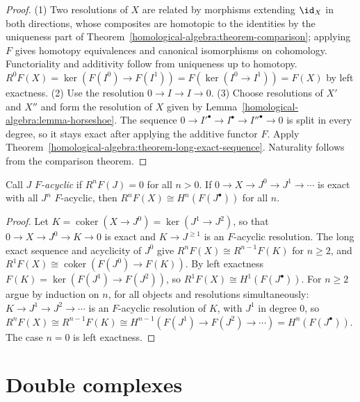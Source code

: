 \begin{proof}
(1) Two resolutions of $X$ are related by morphisms extending $\id_X$ in both directions, whose composites are homotopic
to the identities by the uniqueness part of Theorem~\ref{homological-algebra:theorem-comparison}; applying $F$ gives
homotopy equivalences and canonical isomorphisms on cohomology. Functoriality and additivity follow from uniqueness up
to homotopy. $R^0F(X) = \ker(F(I^0) \to F(I^1)) = F(\ker(I^0 \to I^1)) = F(X)$ by left exactness.
(2) Use the resolution $0 \to I \to I \to 0$.
(3) Choose resolutions of $X'$ and $X''$ and form the resolution of $X$ given by
Lemma~\ref{homological-algebra:lemma-horseshoe}. The sequence $0 \to I'^\bullet \to I^\bullet \to I''^\bullet \to 0$ is split in every
degree, so it stays exact after applying the additive functor $F$. Apply
Theorem~\ref{homological-algebra:theorem-long-exact-sequence}. Naturality follows from the comparison theorem.
\end{proof}

\begin{proposition}\label{homological-algebra:proposition-acyclic-resolutions}
Call $J$ \emph{$F$-acyclic} if $R^nF(J) = 0$ for all $n > 0$. If $0 \to X \to J^0 \to J^1 \to \cdots$ is exact with all $J^n$
$F$-acyclic, then $R^nF(X) \cong H^n(F(J^\bullet))$ for all $n$.
\end{proposition}

\begin{proof}
Let $K = \operatorname{coker}(X \to J^0) = \ker(J^1 \to J^2)$, so that $0 \to X \to J^0 \to K \to 0$ is exact and $K \to J^{\geq 1}$ is an $F$-acyclic
resolution. The long exact sequence and acyclicity of $J^0$ give $R^nF(X) \cong R^{n-1}F(K)$ for $n \geq 2$, and
$R^1F(X) \cong \operatorname{coker}(F(J^0) \to F(K))$. By left exactness $F(K) = \ker(F(J^1) \to F(J^2))$, so
$R^1F(X) \cong H^1(F(J^\bullet))$. For $n \geq 2$ argue by induction on $n$, for all objects and resolutions simultaneously:
$K \to J^1 \to J^2 \to \cdots$ is an $F$-acyclic resolution of $K$, with $J^1$ in degree $0$, so
$R^nF(X) \cong R^{n-1}F(K) \cong H^{n-1}(F(J^1) \to F(J^2) \to \cdots) = H^n(F(J^\bullet))$. The case $n = 0$ is left exactness.
\end{proof}

\section{Double complexes}\label{homological-algebra:section-double-complexes}

